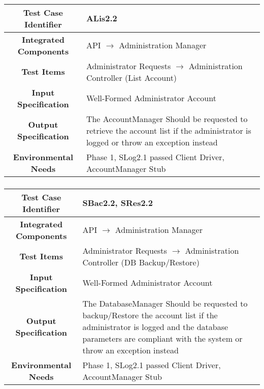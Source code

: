 \documentclass[11pt, a4paper,titlepage]{article}
\begin{document}
		 \subsubsection{}
 		 \begin{tabularx}{\textwidth}{| c|X|}
	 		 	\hline \textbf{Test Case Identifier} & \label{ALis2.2}ALis2.2 \\
	 		 	\hline \textbf{Integrated Components} &  API $\rightarrow $ Administration Manager \\
	 		 	\hline \textbf{Test Items} &  Administrator Requests  $\rightarrow $ Administration Controller (List Account)\\
	 		 	\hline \textbf{Input Specification} &  Well-Formed Administrator Account\\
	 		 	\hline \textbf{Output Specification} & The AccountManager Should be requested to retrieve the account list if the administrator is logged or throw an exception instead\\
	 		 	\hline \textbf{Environmental Needs} &  Phase 1, SLog2.1 passed \newline 
	 		 	Client Driver, AccountManager Stub\\
	 		 	\hline
 		 \end{tabularx}
 		 \newline
		 \subsubsection{}
		  \begin{tabularx}{\textwidth}{| c|X|}
		  	\hline \textbf{Test Case Identifier} & \label{SBac2.2}SBac2.2, \label{SRes2.2}SRes2.2 \\
		  	\hline \textbf{Integrated Components} &  API $\rightarrow $ Administration Manager \\
		  	\hline \textbf{Test Items} &  Administrator Requests  $\rightarrow $ Administration Controller (DB Backup/Restore)\\
		  	\hline \textbf{Input Specification} &  Well-Formed Administrator Account\\
		  	\hline \textbf{Output Specification} & The DatabaseManager Should be requested to backup/Restore the account list if the administrator is logged and the database parameters are compliant with the system or throw an exception instead\\
		  	\hline \textbf{Environmental Needs} &  Phase 1, SLog2.1 passed \newline 
		  	Client Driver, AccountManager Stub\\
		  	\hline
		  \end{tabularx}
		  \newline
\end{document}
